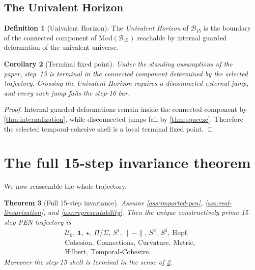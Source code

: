 \documentclass[11pt]{article}
\theoremstyle{plain}
\newtheorem{theorem}{Theorem}[section]
\newtheorem{corollary}[theorem]{Corollary}
\theoremstyle{definition}
\newtheorem{definition}[theorem]{Definition}
\theoremstyle{remark}
\newcommand{\U}{\mathcal{U}}
\newcommand{\B}{\mathcal{B}}
\newcommand{\ModCat}{\mathrm{Mod}}
\begin{document}
\subsection{The Univalent Horizon}

\begin{definition}[Univalent Horizon]
\label{def:horizon}
The \emph{Univalent Horizon} of $\B_{15}$ is the boundary of the connected component of $\ModCat(\B_{15})$ reachable by internal guarded deformation of the univalent universe.
\end{definition}

\begin{corollary}[Terminal fixed point]
\label{cor:terminal}
Under the standing assumptions of the paper, step~15 is terminal in the connected component determined by the selected trajectory. Crossing the Univalent Horizon requires a disconnected external jump, and every such jump fails the step-16 bar.
\end{corollary}

\begin{proof}
Internal guarded deformations remain inside the connected component by \cref{thm:internalization}, while disconnected jumps fail by \cref{thm:squeeze}. Therefore the selected temporal-cohesive shell is a local terminal fixed point.
\end{proof}

\section{The full 15-step invariance theorem}

We now reassemble the whole trajectory.

\begin{theorem}[Full 15-step invariance]
\label{thm:full-invariance}
Assume \cref{ass:imported-pen}, \cref{ass:real-linearization}, and \cref{ass:representability}. Then the unique constructively prime 15-step PEN trajectory is
\[
  \begin{aligned}
    &\U_0,\ \mathbf 1,\ \star,\ \Pi/\Sigma,\ S^1,\ \|{-}\|,\ S^2,\ S^3,\ \mathrm{Hopf},\\
    &\mathrm{Cohesion},\ \mathrm{Connections},\ \mathrm{Curvature},\ \mathrm{Metric},\\
    &\mathrm{Hilbert},\ \mathrm{Temporal\mbox{-}Cohesive}.
  \end{aligned}
\]
Moreover the step-15 shell is terminal in the sense of \cref{cor:terminal}.
\end{theorem}
\end{document}
